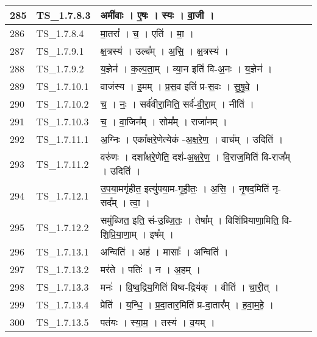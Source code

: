 \documentclass[17pt]{extarticle}
\begin{document}
\begin{longtable}{||p{0.4in}||p{0.9in}||p{4.0in}||p{0.9in}||}
        \hline
            285 & TS\_1.7.8.3 & अमी॑वाः   ।   ए॒षः   ।   स्यः   ।   वा॒जी   ।    &      \\
        \hline
            286 & TS\_1.7.8.4 & मा॒तरा᳚   ।   च॒   ।   एति॑   ।   मा॒   ।    &      \\
        \hline
            287 & TS\_1.7.9.1 & क्ष॒त्रस्य॑   ।   उल्ब᳚म्   ।   अ॒सि॒   ।   क्ष॒त्रस्य॑   ।    &      \\
        \hline
            288 & TS\_1.7.9.2 & य॒ज्ञेन॑   ।   क॒ल्प॒ता॒म्   ।   व्या॒न इति॑ वि{-}अ॒नः   ।   य॒ज्ञेन॑   ।    &      \\
        \hline
            289 & TS\_1.7.10.1 & वाज॑स्य   ।   इ॒मम्   ।   प्र॒स॒व इति॑ प्र{-}स॒वः   ।   सु॒षु॒वे॒   ।    &      \\
        \hline
            290 & TS\_1.7.10.2 & च॒   ।   नः॒   ।   सर्व॑वीरा॒मिति॒ सर्व॑{-}वी॒रा॒म्   ।   नीति॑   ।    &      \\
        \hline
            291 & TS\_1.7.10.3 & च॒   ।   वा॒जिन᳚म्   ।   सोम᳚म्   ।   राजा॑नम्   ।    &      \\
        \hline
            292 & TS\_1.7.11.1 & अ॒ग्निः   ।   एका᳚क्षरे॒णेत्येक॑ {-}अ॒क्ष॒रे॒ण॒   ।   वाच᳚म्   ।   उदिति॑   ।    &      \\
        \hline
            293 & TS\_1.7.11.2 & वरु॑णः   ।   दशा᳚क्षरे॒णेति॒ दश॑{-}अ॒क्ष॒रे॒ण॒   ।   वि॒राज॒मिति॑ वि{-}राज᳚म्   ।   उदिति॑   ।    &      \\
        \hline
            294 & TS\_1.7.12.1 & उ॒प॒या॒मगृ॑हीत॒ इत्यु॑पया॒म{-}गृ॒ही॒तः॒   ।   अ॒सि॒   ।   नृ॒षद॒मिति॑ नृ{-}सद᳚म्   ।   त्वा॒   ।    &      \\
        \hline
            295 & TS\_1.7.12.2 & समु॑ब्जित॒ इति॒ सं{-}उ॒ब्जि॒तः॒   ।   तेषा᳚म्   ।   विशि॑प्रियाणा॒मिति॒ वि{-}शि॒प्रि॒या॒णा॒म्   ।   इष᳚म्   ।    &      \\
        \hline
            296 & TS\_1.7.13.1 & अन्विति॑   ।   अह॑   ।   मासाः᳚   ।   अन्विति॑   ।    &      \\
        \hline
            297 & TS\_1.7.13.2 & मर॑ते   ।   पतिः॑   ।   न   ।   अ॒हम्   ।    &      \\
        \hline
            298 & TS\_1.7.13.3 & मनः॑   ।   वि॒ष्व॒द्रिय॒गिति॑ विष्व{-}द्रिय॑क्   ।   वीति॑   ।   चा॒री॒त्   ।    &      \\
        \hline
            299 & TS\_1.7.13.4 & प्रेति॑   ।   य॒न्धि॒   ।   प्र॒दा॒तार॒मिति॑ प्र{-}दा॒तार᳚म्   ।   ह॒वा॒म॒हे॒   ।    &      \\
        \hline
            300 & TS\_1.7.13.5 & पत॑यः   ।   स्या॒म॒   ।   तस्य॑   ।   व॒यम्   ।    &      \\

\end{longtable}
\end{document}
